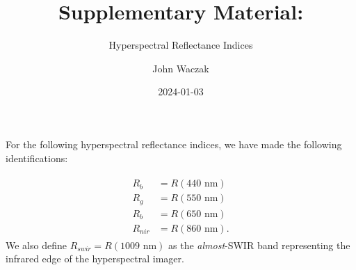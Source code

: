 \documentclass[
  letterpaper,
  DIV=11,
  numbers=noendperiod]{scrartcl}
\title{Supplementary Material:}
\subtitle{Hyperspectral Reflectance Indices}
\author{John Waczak}
\date{2024-01-03}
\begin{document}
\maketitle
\ifdefined\Shaded\renewenvironment{Shaded}{\begin{tcolorbox}[breakable, enhanced, borderline west={3pt}{0pt}{shadecolor}, boxrule=0pt, interior hidden, sharp corners, frame hidden]}{\end{tcolorbox}}\fi

For the following hyperspectral reflectance indices, we have made the
following identifications:

\begin{align}\label{eq:ref-bands}
\begin{split}
    R_b &= R(440 \text{ nm}) \\
    R_g &= R(550 \text{ nm}) \\
    R_b &= R(650 \text{ nm}) \\
    R_{nir} &= R(860 \text{ nm}).
\end{split}
\end{align} We also define \(R_{swir} = R(1009 \text{ nm})\) as the
\emph{almost}-SWIR band representing the infrared edge of the
hyperspectral imager.
\end{document}
